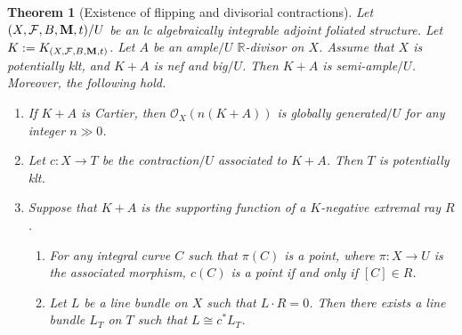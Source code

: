 \documentclass[12pt]{amsart}
\numberwithin{equation}{section}
\newcommand{\Mm}{{\bf{M}}}
\newcommand{\Rr}{\mathbb{R}}
\newcommand{\Ff}{\mathcal{F}}
\newtheorem{thm}{Theorem}[section]
\theoremstyle{definition}
\theoremstyle{definition}
\theoremstyle{definition}
\begin{document}
\begin{thm}[Existence of flipping and divisorial contractions]\label{thm: eo flipping and divisorial contraction}
    Let $(X,\Ff,B,\Mm,t)/U$ be an lc algebraically integrable adjoint foliated structure. Let $K:=K_{(X,\Ff,B,\Mm,t)}$. Let $A$ be an ample$/U$ $\Rr$-divisor on $X$. Assume that $X$ is potentially klt, and $K+A$ is nef and big$/U$. Then $K+A$ is semi-ample$/U$. Moreover, the following hold.
    \begin{enumerate}
        \item If $K+A$ is Cartier, then $\mathcal{O}_X(n(K+A))$ is globally generated$/U$ for any integer $n\gg 0$.
        \item Let $c: X\rightarrow T$ be the contraction$/U$ associated to $K+A$. Then $T$ is potentially klt.
        \item Suppose that $K+A$ is the supporting function of a $K$-negative extremal ray $R$.
\begin{enumerate}
    \item For any integral curve $C$ such that $\pi(C)$ is a point, where $\pi: X\rightarrow U$ is the associated morphism, $c(C)$ is a point if and only if $[C]\in R$.
    \item Let $L$ be a line bundle on $X$ such that $L\cdot R=0$. Then there exists a line bundle $L_T$ on $T$ such that $L\cong c^\ast L_T$.
    \end{enumerate}
    \end{enumerate}
\end{thm}
\end{document}
